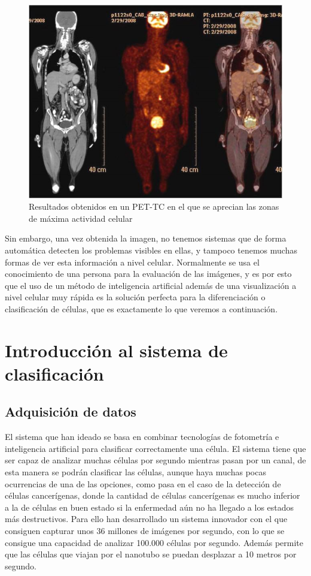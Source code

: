\documentclass[a4paper, 12pt, UTF8]{article}
\begin{document}
\begin{figure}[H]
	\centering
	\includegraphics[width=\linewidth]{intro_1}
	\caption{Resultados obtenidos en un PET-TC en el que se aprecian las zonas de máxima actividad celular}
\end{figure}

Sin embargo, una vez obtenida la imagen, no tenemos sistemas que de forma automática detecten los problemas visibles en ellas, y tampoco tenemos muchas formas de ver esta información a nivel celular. Normalmente se usa el conocimiento de una persona para la evaluación de las imágenes, y es por esto que el uso de un método de inteligencia artificial además de una visualización a nivel celular muy rápida es la solución perfecta para la diferenciación o clasificación de células, que es exactamente lo que veremos a continuación.

\section{Introducción al sistema de clasificación}

\subsection{Adquisición de datos}
El sistema que han ideado se basa en combinar tecnologías de fotometría e inteligencia artificial para clasificar correctamente una célula. El sistema tiene que ser capaz de analizar muchas células por segundo mientras pasan por un canal, de esta manera se podrán clasificar las células, aunque haya muchas pocas ocurrencias de una de las opciones, como pasa en el caso de la detección de células cancerígenas, donde la cantidad de células cancerígenas es mucho inferior a la de células en buen estado si la enfermedad aún no ha llegado a los estados más destructivos. Para ello han desarrollado un sistema innovador con el que consiguen capturar unos 36 millones de imágenes por segundo, con lo que se consigue una capacidad de analizar 100.000 células por segundo. Además permite que las células que viajan por el nanotubo se puedan desplazar a 10 metros por segundo.
\end{document}
